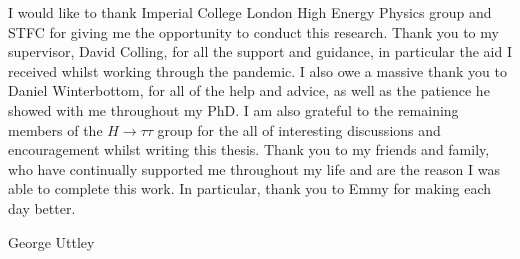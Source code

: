 \begin{titlepage}
\begin{adjustwidth}{1cm}{1cm}
I would like to thank Imperial College London High Energy Physics group and STFC for giving me the opportunity to conduct this research.
Thank you to my supervisor, David Colling, for all the support and guidance, in particular the aid I received whilst working through the pandemic.
I also owe a massive thank you to Daniel Winterbottom, for all of the help and advice, as well as the patience he showed with me throughout my PhD.
I am also grateful to the remaining members of the $H\rightarrow\tau\tau$ group for the all of interesting discussions and encouragement whilst writing this thesis.
Thank you to my friends and family, who have continually supported me throughout my life and are the reason I was able to complete this work.
In particular, thank you to Emmy for making each day better.

\begin{FlushRight}
George Uttley
\end{FlushRight}
\end{adjustwidth}
\vspace*{\fill}

\end{titlepage}